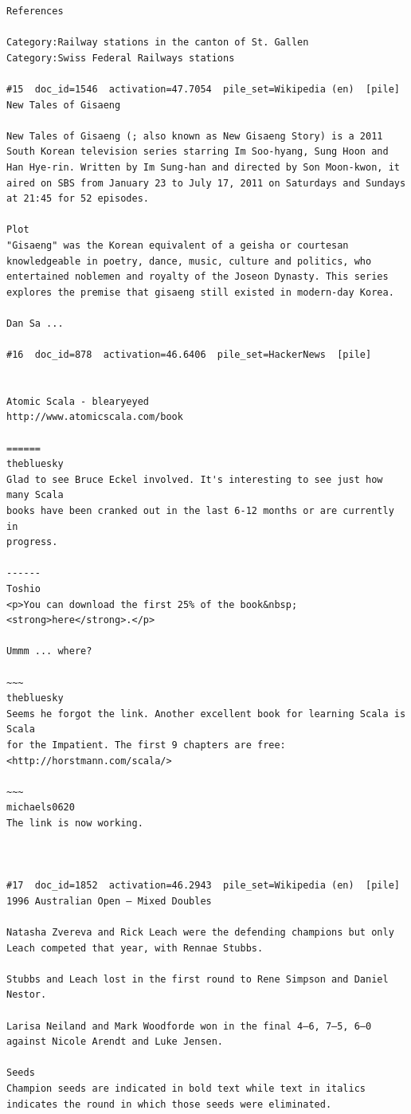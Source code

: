 \begin{verbatim}
References 

Category:Railway stations in the canton of St. Gallen
Category:Swiss Federal Railways stations

#15  doc_id=1546  activation=47.7054  pile_set=Wikipedia (en)  [pile]
New Tales of Gisaeng

New Tales of Gisaeng (; also known as New Gisaeng Story) is a 2011 South Korean television series starring Im Soo-hyang, Sung Hoon and Han Hye-rin. Written by Im Sung-han and directed by Son Moon-kwon, it aired on SBS from January 23 to July 17, 2011 on Saturdays and Sundays at 21:45 for 52 episodes.

Plot
"Gisaeng" was the Korean equivalent of a geisha or courtesan knowledgeable in poetry, dance, music, culture and politics, who entertained noblemen and royalty of the Joseon Dynasty. This series explores the premise that gisaeng still existed in modern-day Korea.

Dan Sa ...

#16  doc_id=878  activation=46.6406  pile_set=HackerNews  [pile]


Atomic Scala - blearyeyed
http://www.atomicscala.com/book

======
thebluesky
Glad to see Bruce Eckel involved. It's interesting to see just how many Scala
books have been cranked out in the last 6-12 months or are currently in
progress.

------
Toshio
<p>You can download the first 25% of the book&nbsp;<strong>here</strong>.</p>

Ummm ... where?

~~~
thebluesky
Seems he forgot the link. Another excellent book for learning Scala is Scala
for the Impatient. The first 9 chapters are free:
<http://horstmann.com/scala/>

~~~
michaels0620
The link is now working.



#17  doc_id=1852  activation=46.2943  pile_set=Wikipedia (en)  [pile]
1996 Australian Open – Mixed Doubles

Natasha Zvereva and Rick Leach were the defending champions but only Leach competed that year, with Rennae Stubbs.

Stubbs and Leach lost in the first round to Rene Simpson and Daniel Nestor.

Larisa Neiland and Mark Woodforde won in the final 4–6, 7–5, 6–0 against Nicole Arendt and Luke Jensen.

Seeds
Champion seeds are indicated in bold text while text in italics indicates the round in which those seeds were eliminated.


\end{verbatim}
